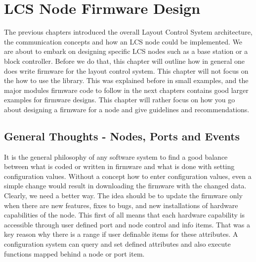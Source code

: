 \chapter{LCS Node Firmware Design}

The previous chapters introduced the overall Layout Control System architecture, the communication concepts and how an LCS node could be implemented. We are about to embark on designing specific LCS nodes such as a base station or a block controller. Before we do that, this chapter will outline how in general one does write firmware for the layout control system. This chapter will not focus on the how to use the library. This was explained before in small examples, and the major modules firmware code to follow in the next chapters contains good larger examples for firmware designs. This chapter will rather focus on how you go about designing a firmware for a node and give guidelines and recommendations.

\section{General Thoughts - Nodes, Ports and Events}

It is the general philosophy of any software system to find a good balance between what is coded or written in firmware and what is done with setting configuration values. Without a concept how to enter configuration values, even a simple change would result in downloading the firmware with the changed data. Clearly, we need a better way. The idea should be to update the firmware only when there are new features, fixes to bugs, and new installations of hardware capabilities of the node. This first of all means that each hardware capability is accessible through user defined port and node control and info items. That was a key reason why there is a range if user definable items for these attributes. A configuration system can query and set defined attributes and also execute functions mapped behind a node or port item.

